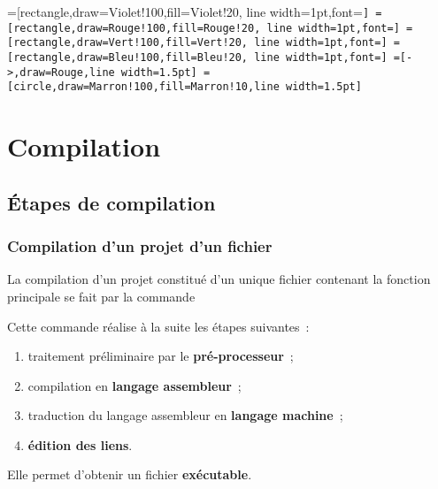 
=[rectangle,draw=Violet!100,fill=Violet!20,
    line width=1pt,font=\scriptsize\tt]
=[rectangle,draw=Rouge!100,fill=Rouge!20,
    line width=1pt,font=\scriptsize\tt]
=[rectangle,draw=Vert!100,fill=Vert!20,
    line width=1pt,font=\scriptsize\tt]
=[rectangle,draw=Bleu!100,fill=Bleu!20,
    line width=1pt,font=\scriptsize\tt]
=[->,draw=Rouge,line width=1.5pt]
=[circle,draw=Marron!100,fill=Marron!10,line width=1.5pt]

\section{Compilation}

\subsection{Étapes de compilation}

\begin{frame}[fragile]
\frametitle{Compilation d'un projet d'un fichier}
La \alert{compilation} d'un projet constitué d'un \alert{unique fichier}
 contenant la fonction principale  se fait
par la commande
\begin{center}\end{center}
\medskip

Cette commande réalise à la suite les étapes suivantes~:
\begin{enumerate}
    \item traitement préliminaire par le {\bf pré-processeur}~;
    \smallskip

    \item compilation en {\bf langage assembleur}~;
    \smallskip

    \item traduction du langage assembleur en {\bf langage machine}~;
    \smallskip

    \item {\bf édition des liens}.
\end{enumerate}
\medskip

Elle permet d'obtenir un fichier {\bf exécutable}.
\end{frame}

